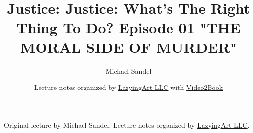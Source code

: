 \documentclass[11pt,oneside]{book}
\begin{document}
\frontmatter
\title{Justice: Justice: What's The Right Thing To Do? Episode 01 "THE MORAL SIDE OF MURDER"}
\author{Michael Sandel}
\date{Lecture notes organized by \href{https://lazying.art}{LazyingArt LLC} with \href{https://github.com/lachlanchen/Video2Book}{Video2Book}}
\maketitle
\begin{center}
\small Original lecture by Michael Sandel. Lecture notes organized by \href{https://lazying.art}{LazyingArt LLC}.
\end{center}
\clearpage
\mainmatter

\end{document}
